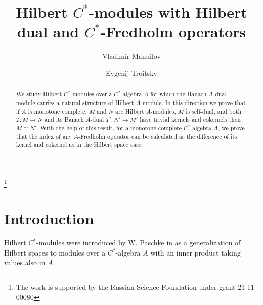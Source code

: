 \documentclass[12pt]{amsart}
\begin{document}
\title[Hilbert $C^*$-modules with Hilbert dual]{Hilbert $C^*$-modules with Hilbert dual and $C^*$-Fredholm operators}
\author{Vladimir Manuilov}
\author{Evgenij Troitsky}
\thanks{ The work is supported by the Russian Science Foundation under grant 21-11-00080}
\address{Moscow Center for Fundamental and Applied Mathematics, 
	Lomonosov Moscow State University, 119991 Moscow, Russia}

\begin{abstract}
We study Hilbert $C^*$-modules over a $C^*$-algebra $A$ for which the Banach $A$-dual module
carries a natural structure of Hilbert $A$-module. In this direction we prove that 
if $A$ is monotone complete, $M$ and $N$ are Hilbert $A$-modules,  $M$ is self-dual, and both 
$T:M\to N$ and its Banach $A$-dual $T':N'\to M'$ have trivial kernels and cokernels then $M\cong N'$.
With the help of this result, for a monotone complete $C^*$-algebra $A$, we prove that the index of any $A$-Fredholm operator
can be calculated as the difference of its kernel and cokernel as in the Hilbert space case.
\end{abstract}


\maketitle

\section{Introduction}



Hilbert $C^*$-modules were introduced by W. Paschke in \cite{Pas1} as a generalization of Hilbert spaces to modules over a $C^*$-algebra $A$ with an inner product taking values also in $A$. 
\end{document}
